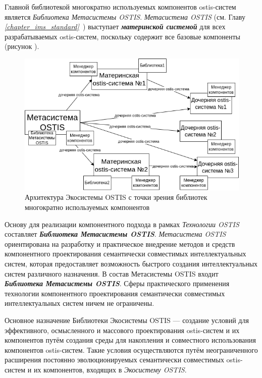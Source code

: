 Главной библиотекой многократно используемых компонентов ostis-систем является \textit{Библиотека Метасистемы OSTIS}. \textit{Метасистема OSTIS} (см. Главу \textit{\ref{chapter_ims_standard}~}) выступает \textbf{\textit{материнской системой}} для всех разрабатываемых ostis-систем, поскольку содержит все базовые компоненты (рисунок \textit{}).

\begin{figure}[H]
	\includegraphics[scale=0.8]{author/part5/figures/ecosystem_architecture.png}
	\caption{Архитектура Экосистемы OSTIS с точки зрения библиотек многократно используемых компонентов}
	\label{fig:ecosystem_architecture}
\end{figure}

Основу для реализации компонентного подхода в рамках \textit{Технологии OSTIS} составляет \textbf{\textit{Библиотека Метасистемы OSTIS}}. \textit{Метасистема OSTIS} ориентирована на разработку и практическое внедрение методов и средств компонентного проектирования семантически совместимых интеллектуальных систем, которая предоставляет возможность быстрого создания интеллектуальных систем различного назначения. В состав Метасистемы OSTIS входит \textbf{\textit{Библиотека Метасистемы OSTIS}}. Сферы практического применения технологии компонентного проектирования семантически совместимых интеллектуальных систем ничем не ограничены.

Основное назначение Библиотеки Экосистемы OSTIS --- создание условий для эффективного, осмысленного и массового проектирования ostis-систем и их компонентов путём создания среды для накопления и совместного использования компонентов ostis-систем. Такие условия осуществляются путём неограниченного расширения постоянно эволюционируемых семантически совместимых ostis-систем и их компонентов, входящих в \textit{Экосистему OSTIS}.

